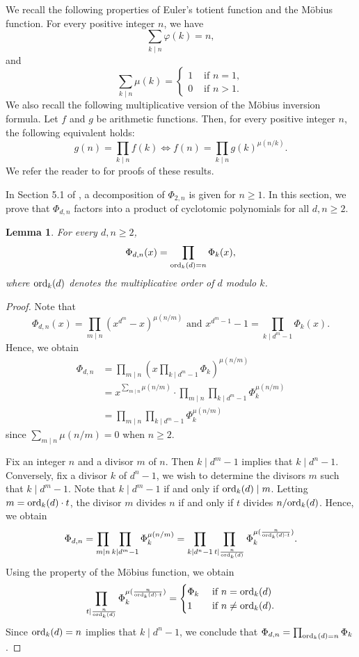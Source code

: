 \documentclass[10pt,leqno]{amsart}
\newtheorem{lemma}[theorem]{Lemma}
\theoremstyle{definition}
\theoremstyle{remark}
\numberwithin{equation}{section}
\def\ord{{\rm ord}}
\begin{document}
We recall the following properties of Euler's totient function and the Möbius function. For every positive integer $n$, we have
$$\sum_{k\mid n}\varphi(k) = n,$$
and
$$\sum_{k\mid n}\mu(k) = \begin{cases}
    1&\text{ if }n = 1,\\
    0&\text{ if }n>1.
\end{cases}$$
We also recall the following multiplicative version of the Möbius inversion formula. Let $f$ and $g$ be arithmetic functions. Then, for every positive integer $n$, the following equivalent holds:
$$g(n) = \prod_{k\mid n}f(k)\Leftrightarrow f(n) = \prod_{k\mid n}g(k)^{\mu(n/k)}.$$
We refer the reader to \cite[Chapter 2]{Apostol76} for proofs of these results.

In Section 5.1 of \cite{Vivaldi92}, a decomposition of $\Phi_{2,n}$ is given for $n\geq 1$. In this section, we prove that $\Phi_{d,n}$ factors into a product of cyclotomic polynomials for all $d,n\geq 2$.

\begin{lemma}
    For every $d,n\geq 2$,
    $$\Phi_{d,n}(x) = \prod_{\ord_k(d) = n}\Phi_k(x),$$
    where $\ord_k(d)$ denotes the multiplicative order of $d$ modulo $k$.
\end{lemma}

\begin{proof}
    Note that
    $$\Phi_{d,n}(x) = \prod_{m\mid n}(x^{d^m}-x)^{\mu(n/m)} \text{ and }x^{d^m-1}-1 = \prod_{k\mid d^m-1}\Phi_k(x).$$
    Hence, we obtain
    \begin{align*}
        \Phi_{d,n} &= \prod_{m\mid n}\left(x\prod_{k\mid d^m-1}\Phi_k\right)^{\mu(n/m)}\\
        &= x^{\sum_{m\mid n}\mu(n/m)}\cdot\prod_{m\mid n}\prod_{k\mid d^m-1}\Phi_k^{\mu(n/m)}\\
        &= \prod_{m\mid n}\prod_{k\mid d^m-1}\Phi_k^{\mu(n/m)}
    \end{align*}
    since $\sum_{m\mid n}\mu(n/m) = 0$ when $n\geq 2$. 
    
    Fix an integer $n$ and a divisor $m$ of $n$. Then $k\mid d^m-1$ implies that $k\mid d^n-1$. Conversely, fix a divisor $k$ of $d^n-1$, we wish to determine the divisors $m$ such that $k\mid d^m-1$. Note that $k\mid d^m-1$ if and only if $\ord_k(d)\mid m$. Letting $m = \ord_k(d)\cdot t$, the divisor $m$ divides $n$ if and only if $t$ divides $n/\ord_k(d)$. Hence, we obtain
    $$\Phi_{d,n} = \prod_{m\mid n}\prod_{k\mid d^m-1}\Phi_k^{\mu(n/m)} = \prod_{k\mid d^n-1}\prod_{t\mid \frac{n}{\ord_k(d)}}\Phi_k^{\mu(\frac{n}{\ord_k(d)\cdot t})}.$$
    Using the property of the Möbius function, we obtain
    $$\prod_{t\mid \frac{n}{\ord_k(d)}}\Phi_k^{\mu(\frac{n}{\ord_k(d)\cdot t})} = \begin{cases}
        \Phi_k &\text{ if }n = \ord_k(d)\\
        1&\text{ if }n\neq \ord_k(d).
    \end{cases}$$
    Since $\ord_k(d) = n$ implies that $k\mid d^n-1$, we conclude that $\Phi_{d,n} = \prod_{\ord_k(d) = n}\Phi_k$.
\end{proof}
\end{document}
